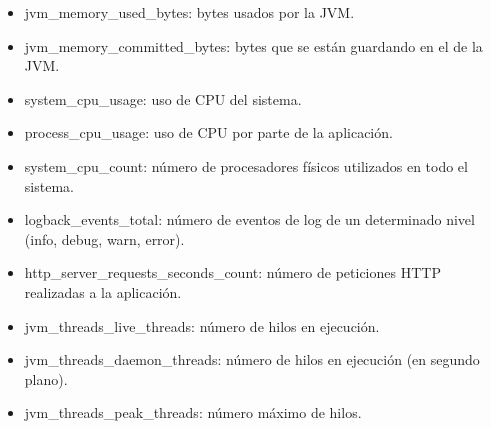 \begin{itemize}
	\item jvm\_memory\_used\_bytes: bytes usados por la JVM\@.
	\item jvm\_memory\_committed\_bytes: bytes que se están guardando en el  de la JVM\@.
	\item system\_cpu\_usage: uso de CPU del sistema.
	\item process\_cpu\_usage: uso de CPU por parte de la aplicación.
	\item system\_cpu\_count: número de procesadores físicos utilizados en todo el sistema.
	\item logback\_events\_total: número de eventos de log de un determinado nivel (info, debug, warn, error).
	\item http\_server\_requests\_seconds\_count: número de peticiones HTTP realizadas a la aplicación.
	\item jvm\_threads\_live\_threads: número de hilos en ejecución.
	\item jvm\_threads\_daemon\_threads: número de hilos en ejecución (en segundo plano).
	\item jvm\_threads\_peak\_threads: número máximo de hilos.
\end{itemize}
\label{itm:most-used-metrics}




